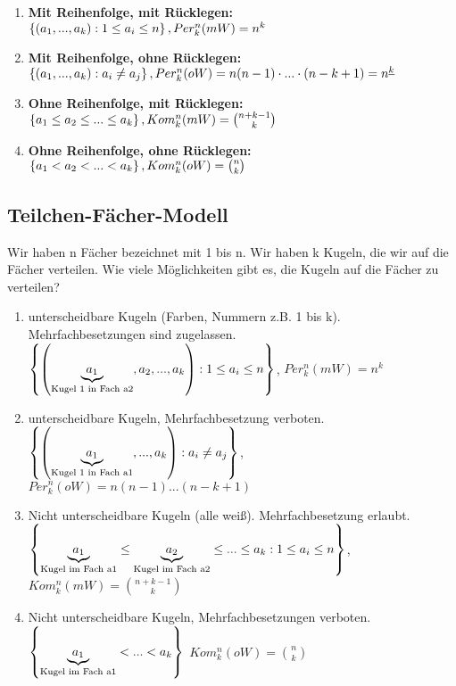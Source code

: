 \begin{enumerate}
\item \textbf{Mit Reihenfolge, mit Rücklegen:}\\
	$  \left\lbrace  \left( a_1,...,a_k \right)  : 1\leq a_i \leq n \right\rbrace , Per_k^n(mW) = n^k$
\item \textbf{Mit Reihenfolge, ohne Rücklegen:}\\
	$  \left\lbrace  \left( a_1,...,a_k \right)  : a_i \neq a_j \right\rbrace , Per_k^n(oW) = n(n-1)\cdot ... \cdot (n-k+1)=n^{\underline{k}}$
\item \textbf{Ohne Reihenfolge, mit Rücklegen:} \\
	$  \left\lbrace a_1 \leq a_2 \leq ... \leq a_k \right\rbrace , Kom_k^n(mW) = \binom{n+k-1}{k}$
\item \textbf{Ohne Reihenfolge, ohne Rücklegen:}\\
	$  \left\lbrace a_1 < a_2 < ... < a_k \right\rbrace , Kom_k^n(oW) = \binom{n}{k}$
\end{enumerate}

\subsection{Teilchen-Fächer-Modell}
Wir haben n Fächer bezeichnet mit 1 bis n. Wir haben k Kugeln, die wir auf die Fächer verteilen. Wie viele Möglichkeiten gibt es, die Kugeln auf die Fächer zu verteilen? 

\begin{enumerate}
\item unterscheidbare Kugeln (Farben, Nummern z.B. 1 bis k). Mehrfachbesetzungen sind zugelassen.\\
$  \left\lbrace   \left( \underbrace{a_1}_{\textrm{Kugel 1 in Fach a2}},a_2, ..., a_k \right)  : 1\leq a_i \leq n \right\rbrace $, $Per_k^n(mW)=n^k$

\item unterscheidbare Kugeln, Mehrfachbesetzung verboten.\\
$ \left\lbrace  \left( \underbrace{a_1}_{\textrm{Kugel 1 in Fach a1}},...,a_k \right) :a_i\neq a_j \right\rbrace $, $Per_k^n(oW)=n(n-1) ... (n-k+1)$

\item Nicht unterscheidbare Kugeln (alle weiß). Mehrfachbesetzung erlaubt.\\
$  \left\lbrace \underbrace{a_1}_{\textrm{Kugel im Fach a1}} \leq \underbrace{a_2}_{\textrm{Kugel im Fach a2}} \leq ... \leq a_k : 1\leq a_i \leq n \right\rbrace  $,
$Kom_k^n(mW)=\binom{n+k-1}{k}$

\item Nicht unterscheidbare Kugeln, Mehrfachbesetzungen verboten.\\
$ \left\lbrace \underbrace{a_1}_{\textrm{Kugel im Fach a1}} < ... < a_k \right\rbrace $
$Kom_k^n(oW)=\binom n k $
\end{enumerate}
